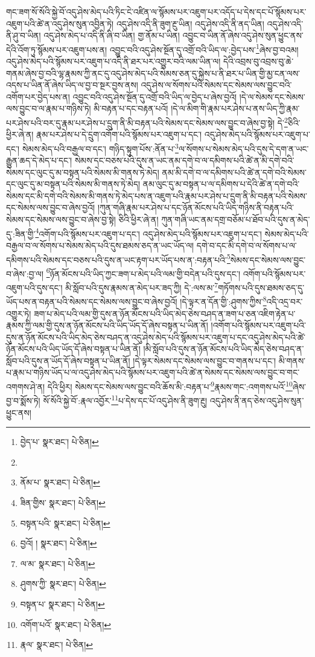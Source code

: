 གང་ཟག་སོ་སོའི་སྐྱེ་བོ་འདུ་ཤེས་མེད་པའི་ཏིང་ངེ་འཛིན་ལ་སྙོམས་པར་འཇུག་པར་འདོད་པ་དེས་དང་པོ་སྙོམས་པར་འཇུག་པའི་ཚེ་ན་འདུ་ཤེས་སུན་འབྱིན་ཏེ། འདུ་ཤེས་འདི་ནི་ཟུག་རྔུ་ཡིན། འདུ་ཤེས་འདི་ནི་ནད་ཡིན། འདུ་ཤེས་འདི་ནི་ཤུ་བ་ཡིན། འདུ་ཤེས་མེད་པ་འདི་ནི་ཞི་བ་ཡིན། གྱ་ནོམ་པ་ཡིན། འབྱུང་བ་ཡིན་ནོ་ཞེས་འདུ་ཤེས་སུན་ཕྱུང་ནས་དེའི་འོག་ཏུ་སྙོམས་པར་འཇུག་པས་ན། འབྱུང་བའི་འདུ་ཤེས་སྔོན་དུ་འགྲོ་བའི་ཡིད་ལ་:བྱེད་པས་\footnote{བྱེད་པ་  སྣར་ཐང་།  པེ་ཅིན། }ཞེས་བྱ་བའམ། འདུ་ཤེས་མེད་པའི་སྙོམས་པར་འཇུག་པ་འདི་ནི་ཐར་པར་འགྱུར་བའི་ལམ་ཡིན་ལ། དེའི་འབྲས་བུ་འབྲས་བུ་ཆེ་གནམ་ཞེས་བྱ་བའི་ལྷ་རྣམས་ཀྱི་ནང་དུ་འདུ་ཤེས་མེད་པའི་སེམས་ཅན་དུ་སྐྱེས་པ་ནི་ཐར་པ་ཡིན་གྱི་མྱ་ངན་ལས་འདས་པ་ཡིན་ནོ་ཞེས་ཡིད་ལ་བྱ་བ་སྔར་བྱས་ནས། འདུ་ཤེས་ལ་སོགས་པའི་སེམས་དང་སེམས་ལས་བྱུང་བའི་འགོག་པར་བྱེད་པས་ན། འབྱུང་བའི་འདུ་ཤེས་སྔོན་དུ་འགྲོ་བའི་ཡིད་ལ་བྱེད་པ་ཞེས་བྱའོ། །དེ་ལ་སེམས་དང་སེམས་ལས་བྱུང་བ་ལ་རྣམ་པ་གཉིས་ཏེ། མི་བརྟན་པ་དང་བརྟན་པའོ། །དེ་ལ་མིག་གི་རྣམ་པར་ཤེས་པ་ནས་ཡིད་ཀྱི་རྣམ་པར་ཤེས་པའི་བར་དུ་རྣམ་པར་ཤེས་པ་དྲུག་ནི་མི་བརྟན་པའི་སེམས་དང་སེམས་ལས་བྱུང་བ་ཞེས་བྱ་སྟེ། དེ་\footnote{}ཅིའི་ཕྱིར་ཞེ་ན། རྣམ་པར་ཤེས་པ་དེ་དྲུག་འགོག་པའི་སྙོམས་པར་འཇུག་པ་དང་། འདུ་ཤེས་མེད་པའི་སྙོམས་པར་འཇུག་པ་དང་། སེམས་མེད་པའི་བརྒྱལ་བ་དང་། གཉིད་སྟུག་པོས་:ནོན་པ་\footnote{ནོམ་པ་  སྣར་ཐང་།  པེ་ཅིན། }ལ་སོགས་པ་སེམས་མེད་པའི་དུས་དེ་དག་ན་ཡང་རྒྱུན་ཆད་དེ་མེད་པ་དང་། སེམས་དང་བཅས་པའི་དུས་ན་ཡང་ནམ་དགེ་བ་ལ་དམིགས་པའི་ཚེ་ན་མི་དགེ་བའི་སེམས་དང་ལུང་དུ་མ་བསྟན་པའི་སེམས་མི་གནས་ཏེ་མེད། ནམ་མི་དགེ་བ་ལ་དམིགས་པའི་ཚེ་ན་དགེ་བའི་སེམས་དང་ལུང་དུ་མ་བསྟན་པའི་སེམས་མི་གནས་ཏེ་མེད། ནམ་ལུང་དུ་མ་བསྟན་པ་ལ་དམིགས་པ་དེའི་ཚེ་ན་དགེ་བའི་སེམས་དང་མི་དགེ་བའི་སེམས་མི་གནས་ཏེ་མེད་པས་ན་འཇུག་པའི་རྣམ་པར་ཤེས་པ་དྲུག་ནི་མི་བརྟན་པའི་སེམས་དང་སེམས་ལས་བྱུང་བ་ཞེས་བྱའོ། །ཀུན་གཞི་རྣམ་པར་ཤེས་པ་དང་ཉོན་མོངས་པའི་ཡིད་གཉིས་ནི་བརྟན་པའི་སེམས་དང་སེམས་ལས་བྱུང་བ་ཞེས་བྱ་སྟེ། ཅིའི་ཕྱིར་ཞེ་ན། ཀུན་གཞི་ཡང་ནམ་དགྲ་བཅོམ་པ་ཐོབ་པའི་དུས་ན་མེད་དུ་:ཟིན་གྱི་\footnote{ཟིན་གྱིས་  སྣར་ཐང་།  པེ་ཅིན། }འགོག་པའི་སྙོམས་པར་འཇུག་པ་དང་། འདུ་ཤེས་མེད་པའི་སྙོམས་པར་འཇུག་པ་དང་། སེམས་མེད་པའི་བརྒྱལ་བ་ལ་སོགས་པ་སེམས་མེད་པའི་དུས་ཐམས་ཅད་ན་ཡང་ཡོད་ལ། དགེ་བ་དང་མི་དགེ་བ་ལ་སོགས་པ་ལ་དམིགས་པའི་སེམས་དང་བཅས་པའི་དུས་ན་ཡང་རྟག་པར་ཡོད་པས་ན་:བརྟན་པའི་\footnote{བསྟན་པའི་  སྣར་ཐང་།  པེ་ཅིན། }སེམས་དང་སེམས་ལས་བྱུང་བ་ཞེས་:བྱ་ལ། \footnote{བྱའོ། །   སྣར་ཐང་།  པེ་ཅིན། }ཉོན་མོངས་པའི་ཡིད་ཀྱང་ཟག་པ་མེད་པའི་ལམ་གྱི་བདེན་པའི་དུས་དང་། འགོག་པའི་སྙོམས་པར་འཇུག་པའི་དུས་དང་། མི་སློབ་པའི་དུས་རྣམས་ན་མེད་པར་ཟད་ཀྱི། དེ་:ལས་མ་\footnote{ལ་མ་  སྣར་ཐང་།  པེ་ཅིན། }གཏོགས་པའི་དུས་ཐམས་ཅད་དུ་ཡོད་པས་ན་བརྟན་པའི་སེམས་དང་སེམས་ལས་བྱུང་བ་ཞེས་བྱའོ། །དེ་ལྟར་ན་དོན་གྱི་:ཤུགས་ཀྱིས་\footnote{ཤུགས་ཀྱི་  སྣར་ཐང་།  པེ་ཅིན། }འདི་འདྲ་བར་འགྱུར་ཏེ། ཟག་པ་མེད་པའི་ལམ་གྱི་དུས་ན་ཉོན་མོངས་པའི་ཡིད་མེད་ཅེས་བཤད་ན་ཟག་པ་ཅན་འཇིག་རྟེན་པ་རྣམས་ཀྱི་ལམ་གྱི་དུས་ན་ཉོན་མོངས་པའི་ཡིད་ཡོད་དོ་ཞེས་བསྟན་པ་ཡིན་ནོ། །འགོག་པའི་སྙོམས་པར་འཇུག་པའི་དུས་ན་ཉོན་མོངས་པའི་ཡིད་མེད་ཅེས་བཤད་ན་འདུ་ཤེས་མེད་པའི་སྙོམས་པར་འཇུག་པ་དང་འདུ་ཤེས་མེད་པའི་ཚེ་ཉོན་མོངས་པའི་ཡིད་ཡོད་དོ་ཞེས་བསྟན་པ་ཡིན་ནོ། །མི་སློབ་པའི་དུས་ན་ཉོན་མོངས་པའི་ཡིད་མེད་ཅེས་བཤད་ན་སློབ་པའི་དུས་ན་ཡོད་དོ་ཞེས་བསྟན་པ་ཡིན་ནོ། །དེ་ལྟར་སེམས་དང་སེམས་ལས་བྱུང་བ་གནས་པ་དང་། མི་གནས་པ་རྣམ་པ་གཉིས་ཡོད་པ་ལ་འདུ་ཤེས་མེད་པའི་སྙོམས་པར་འཇུག་པའི་ཚེ་ན་སེམས་དང་སེམས་ལས་བྱུང་བ་གང་འགགས་ཤེ་ན། དེའི་ཕྱིར། སེམས་དང་སེམས་ལས་བྱུང་བའི་ཆོས་མི་:བརྟན་པ་\footnote{བསྟན་པ་  སྣར་ཐང་།  པེ་ཅིན། }རྣམས་གང་:འགགས་པའོ་\footnote{འགོག་པའོ་  སྣར་ཐང་།  པེ་ཅིན། }ཞེས་བྱ་བ་སྨོས་ཏེ། སོ་སོའི་སྐྱེ་བོ་:རྣལ་འབྱོར་\footnote{རྣལ་  སྣར་ཐང་།  པེ་ཅིན། }པ་དེས་དང་པོ་འདུ་ཤེས་ནི་ཟུག་རྔུ། འདུ་ཤེས་ནི་ནད་ཅེས་འདུ་ཤེས་སུན་ཕྱུང་ནས། 